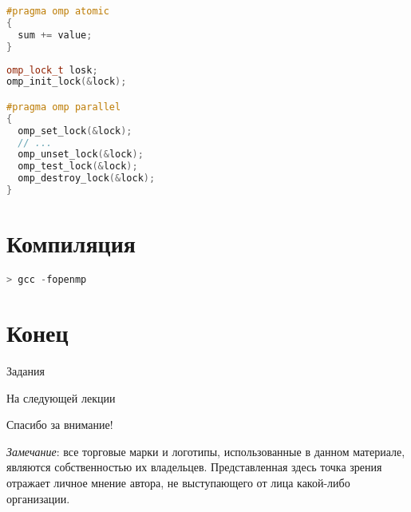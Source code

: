 \begin{frame}[fragile]

\begin{lstlisting}[language=C++,basicstyle=\ttfamily,keywordstyle=\color{blue},basicstyle=\scriptsize]
#pragma omp atomic
{
  sum += value;
}
\end{lstlisting}

\end{frame}

\begin{frame}[fragile]

\begin{lstlisting}[language=C++,basicstyle=\ttfamily,keywordstyle=\color{blue},basicstyle=\scriptsize]
omp_lock_t losk;
omp_init_lock(&lock);

#pragma omp parallel
{
  omp_set_lock(&lock);
  // ...
  omp_unset_lock(&lock);
  omp_test_lock(&lock);
  omp_destroy_lock(&lock);
}
\end{lstlisting}

\end{frame}

\section{Компиляция}

\begin{frame}[fragile]

\begin{lstlisting}[language=C++,basicstyle=\ttfamily,keywordstyle=\color{blue},basicstyle=\scriptsize]
> gcc -fopenmp
\end{lstlisting}

\end{frame}

\section{Конец}

\begin{frame}{Задания}
\end{frame}

\begin{frame}{На следующей лекции}
\end{frame}

\begin{frame}

{\huge{Спасибо за внимание!}\par}

\vfill

\tiny{\textit{Замечание}: все торговые марки и логотипы, использованные в данном материале, являются собственностью их владельцев. Представленная здесь точка зрения отражает личное мнение автора, не выступающего от лица какой-либо организации.}

\end{frame}


